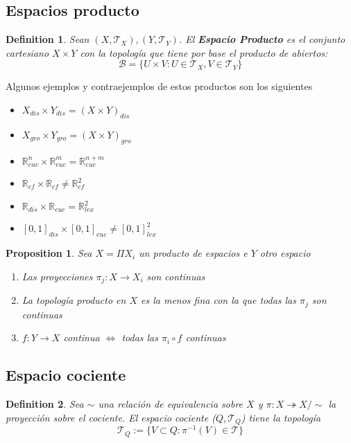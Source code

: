 \documentclass[leqno]{article}
\newtheorem*{definition}{Definition}
\newtheorem*{proposition}{Proposition}
\begin{document}
\subsection{Espacios producto}
\begin{definition}
Sean $(X, \mathcal{T}_X), (Y, \mathcal{T}_Y)$. El \textbf{Espacio Producto} es el conjunto cartesiano $X\times Y$ con la topología que tiene por base el producto de abiertos:
\[
\mathcal{B}=\{U\times V: U\in \mathcal{T}_X, V\in \mathcal{T}_Y\}
\] 
\end{definition}
Algunos ejemplos y contraejemplos de estos productos son los siguientes
\begin{itemize}[topsep=-6pt, itemsep=0pt]
  \item $X_{dis}\times Y_{dis} = (X\times Y)_{dis}$ 
  \item $X_{gro}\times Y_{gro}=(X\times Y)_{gro}$
  \item $\mathbb{R}^n_{euc}\times \mathbb{R}^m_{euc} = \mathbb{R}^{n+m}_{euc}$ 
  \item $\mathbb{R}_{cf}\times \mathbb{R}_{cf} \neq \mathbb{R}^2_{cf}$ 
  \item $\mathbb{R}_{dis}\times \mathbb{R}_{euc} = \mathbb{R}^2_{lex}$ 
  \item $[0,1]_{dis}\times [0, 1]_{euc} \neq  [0, 1]^2_{lex}$
\end{itemize}

\begin{proposition}
Sea $X = \Pi X_i$ un producto de espacios e $Y$ otro espacio
 \begin{enumerate}[topsep=-6pt, itemsep=0pt]
  \item Las proyecciones $\pi_j: X \to X_i$ son continuas
  \item La topología producto en $X$ es la menos fina con la que todas las $\pi_j$ son continuas
  \item  $f:Y\to X$ continua $\iff$ todas las $\pi_i\circ f$ continuas
\end{enumerate}
\end{proposition}

\subsection{Espacio cociente}
\begin{definition}
Sea $\sim $ una relación de equivalencia sobre $X$ y $\pi:X \twoheadrightarrow  X / \sim  $ la proyección sobre el cociente. El espacio cociente ($Q, \mathcal{T}_Q$) tiene la topología
\[
\mathcal{T}_{Q}:= \{V\subset Q:\pi^{-1}(V)\in \mathcal{T}\}
\] 
\end{definition}
\end{document}

